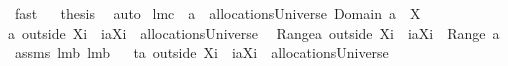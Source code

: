 \begin{isabellebody}
\isamarkupfalse%
\ fast\isanewline
{}\isamarkupfalse%
\ \isamarkupfalse%
\ {\isacharquery}thesis\ \isamarkupfalse%
\ auto\isanewline
{}\isamarkupfalse%
%
\endisatagproof
{\isafoldproof}%
%
\isadelimproof
\isanewline
%
\endisadelimproof
\isanewline
{}\isamarkupfalse%
\ lm{}{}c{\isacharcolon}\ \ {\isachardoublequoteopen}a\ {\isasymin}\ allocationsUniverse{\isachardoublequoteclose}\ {\isachardoublequoteopen}Domain\ a\ {\isasyminter}\ X\ {\isasymnoteq}\ {\isacharbraceleft}{\isacharbraceright}{\isachardoublequoteclose}\ \ \isanewline
{\isachardoublequoteopen}{\isacharparenleft}a\ outside\ {\isacharparenleft}X{\isasymunion}{\isacharbraceleft}i{\isacharbraceright}{\isacharparenright}{\isacharparenright}\ {\isasymunion}\ {\isacharparenleft}{\isacharbraceleft}i{\isacharbraceright}{\isasymtimes}{\isacharbraceleft}{\isasymUnion}{\isacharparenleft}a{\isacharbackquote}{\isacharbackquote}{\isacharparenleft}X{\isasymunion}{\isacharbraceleft}i{\isacharbraceright}{\isacharparenright}{\isacharparenright}{\isacharbraceright}{\isacharparenright}\ {\isasymin}\ allocationsUniverse\ {\isacharampersand}\ \isanewline
{\isasymUnion}{\isacharparenleft}Range{\isacharparenleft}{\isacharparenleft}a\ outside\ {\isacharparenleft}X{\isasymunion}{\isacharbraceleft}i{\isacharbraceright}{\isacharparenright}{\isacharparenright}\ {\isasymunion}\ {\isacharparenleft}{\isacharbraceleft}i{\isacharbraceright}{\isasymtimes}{\isacharbraceleft}{\isasymUnion}{\isacharparenleft}a{\isacharbackquote}{\isacharbackquote}{\isacharparenleft}X{\isasymunion}{\isacharbraceleft}i{\isacharbraceright}{\isacharparenright}{\isacharparenright}{\isacharbraceright}{\isacharparenright}{\isacharparenright}{\isacharparenright}\ {\isacharequal}\ {\isasymUnion}{\isacharparenleft}Range\ a{\isacharparenright}{\isachardoublequoteclose}\isanewline
%
\isadelimproof
%
\endisadelimproof
%
\isatagproof
{}\isamarkupfalse%
\ assms\ lm{}{}b\ lm{}{}b\isanewline
{}\isamarkupfalse%
\ {\isacharminus}\isanewline
{}\isamarkupfalse%
\ {\isacharquery}t{}{\isacharequal}{\isachardoublequoteopen}{\isacharparenleft}a\ outside\ {\isacharparenleft}X{\isasymunion}{\isacharbraceleft}i{\isacharbraceright}{\isacharparenright}{\isacharparenright}\ {\isasymunion}\ {\isacharparenleft}{\isacharbraceleft}i{\isacharbraceright}{\isasymtimes}{\isacharparenleft}{\isacharbraceleft}{\isasymUnion}{\isacharparenleft}a{\isacharbackquote}{\isacharbackquote}{\isacharparenleft}X{\isasymunion}{\isacharbraceleft}i{\isacharbraceright}{\isacharparenright}{\isacharparenright}{\isacharbraceright}{\isacharminus}{\isacharbraceleft}{\isacharbraceleft}{\isacharbraceright}{\isacharbraceright}{\isacharparenright}{\isacharparenright}\ {\isasymin}\ allocationsUniverse{\isachardoublequoteclose}\isanewline

\end{isabellebody}
